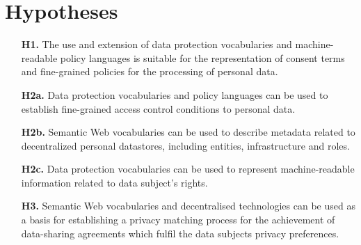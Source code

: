 \section{Hypotheses}
\label{sec:hypotheses}

\begin{enumerate}
    \item [\textbf{H1.}] The use and extension of data protection vocabularies and machine-readable policy languages is suitable for the representation of consent terms and fine-grained policies for the processing of personal data.
    \item [\textbf{H2a.}] Data protection vocabularies and policy languages can be used to establish fine-grained access control conditions to personal data.
    \item [\textbf{H2b.}] Semantic Web vocabularies can be used to describe metadata related to decentralized personal datastores, including entities, infrastructure and roles.
    \item [\textbf{H2c.}] Data protection vocabularies can be used to represent machine-readable information related to data subject's rights.
    \item [\textbf{H3.}] Semantic Web vocabularies and decentralised technologies can be used as a basis for establishing a privacy matching process for the achievement of data-sharing agreements which fulfil the data subjects privacy preferences.
\end{enumerate}
